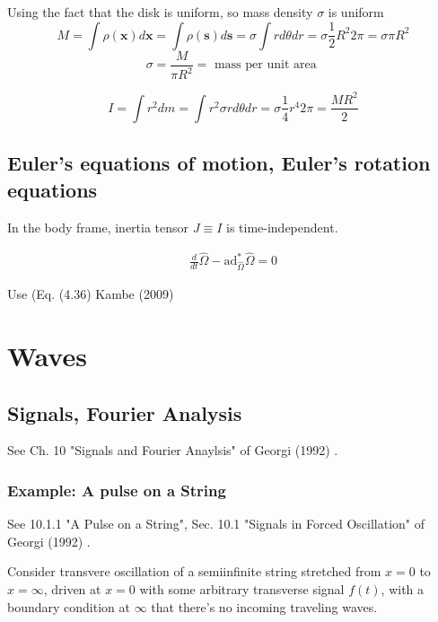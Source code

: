 \begin{enumerate}
Using the fact that the disk is uniform, so mass density $\sigma$ is uniform
\[
M = \int \rho (\mathbf{x}) d\mathbf{x} = \int \rho(\mathbf{s}) d\mathbf{s} = \sigma \int r d\theta dr = \sigma \frac{1}{2} R^2 2\pi = \sigma \pi R^2
\]
\[
\sigma = \frac{M}{\pi R^2} = \text{ mass per unit area }
\]

\begin{equation}
I  = \int r^2 dm = \int r^2 \sigma r d\theta dr = \sigma \frac{1}{4} r^4 2\pi = \boxed{ \frac{MR^2}{2} }
\end{equation}

\end{enumerate}


\subsection{Euler's equations of motion, Euler's rotation equations}

In the body frame, inertia tensor $J \equiv I$ is time-independent.

\[
\begin{gathered}
\frac{d}{dt} \widehat{\Omega} - \text{ad}^*_{\widehat{\Omega}} \widehat{\Omega} = 0 
\end{gathered}
\]

Use (Eq. (4.36) Kambe (2009) \cite{dgdt:TKambe2009}

\section{Waves}

\subsection{Signals, Fourier Analysis}

See Ch. 10 "Signals and Fourier Anaylsis" of Georgi (1992) \cite{dgdt:Geor1992}.

\subsubsection{Example: A pulse on a String}

See 10.1.1 "A Pulse on a String", Sec. 10.1 "Signals in Forced Oscillation" of Georgi (1992) \cite{dgdt:Geor1992}.

Consider transvere oscillation of a semiinfinite string stretched from $x=0$ to $x=\infty$, driven at $x=0$ with some arbitrary transverse signal $f(t)$, with a boundary condition at $\infty$ that there's no incoming traveling waves.

